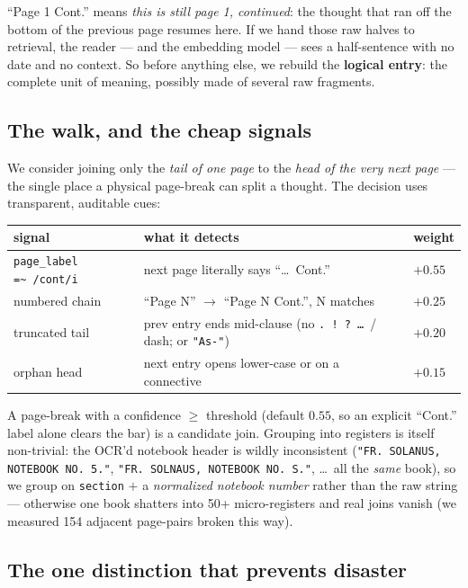 \documentclass[11pt]{article}
\newcommand{\code}[1]{\texttt{\small #1}}
\begin{document}
\noindent``Page 1 Cont.'' means \emph{this is still page 1, continued}: the thought that ran off the
bottom of the previous page resumes here. If we hand those raw halves to retrieval, the reader --- and
the embedding model --- sees a half-sentence with no date and no context. So before anything else, we
rebuild the \textbf{logical entry}: the complete unit of meaning, possibly made of several raw
fragments.

\subsection{The walk, and the cheap signals}

We consider joining only the \emph{tail of one page} to the \emph{head of the very next page} --- the
single place a physical page-break can split a thought. The decision uses transparent, auditable cues:

\begin{numbersbox}
\centering\small
\begin{tabular}{lll}
\toprule
signal & what it detects & weight \\
\midrule
\code{page\_label =\textasciitilde\ /cont/i} & next page literally says ``\ldots\ Cont.'' & $+0.55$ \\
numbered chain & ``Page N'' $\to$ ``Page N Cont.'', N matches & $+0.25$ \\
truncated tail & prev entry ends mid-clause (no \code{.\,!\,?\,…}\ / dash; or \code{"As-"}) & $+0.20$ \\
orphan head & next entry opens lower-case or on a connective & $+0.15$ \\
\bottomrule
\end{tabular}
\end{numbersbox}

\noindent A page-break with a confidence $\ge$ threshold (default $0.55$, so an explicit ``Cont.''
label alone clears the bar) is a candidate join. Grouping into registers is itself non-trivial: the
OCR'd notebook header is wildly inconsistent (\code{"FR. SOLANUS, NOTEBOOK NO. 5."},
\code{"FR. SOLNAUS, NOTEBOOK NO. S."}, \ldots\ all the \emph{same} book), so we group on
\code{section} $+$ a \emph{normalized notebook number} rather than the raw string --- otherwise one
book shatters into 50+ micro-registers and real joins vanish (we measured 154 adjacent page-pairs
broken this way).

\subsection{The one distinction that prevents disaster}
\end{document}
